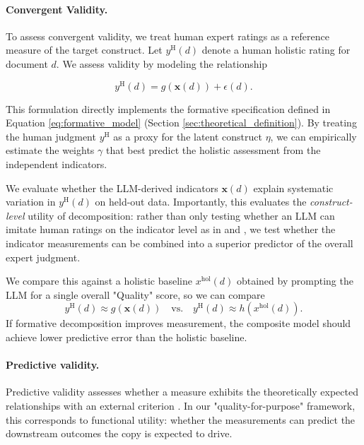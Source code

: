 \paragraph{Convergent Validity.} %
To assess convergent validity, we treat human expert ratings as a reference measure of the target construct. Let $y^{\text{H}}(d)$ denote a human holistic rating for document $d$. We assess validity by modeling the relationship

\begin{equation}\label{eq:convergent_validity_formative}
    y^{\text{H}}(d) = g(\mathbf{x}(d)) + \epsilon(d).
\end{equation}

This formulation directly implements the formative specification defined in Equation \ref{eq:formative_model} (Section \ref{sec:theoretical_definition}). By treating the human judgment $y^{\text{H}}$ as a proxy for the latent construct $\eta$, we can empirically estimate the weights $\gamma$ that best predict the holistic assessment from the independent indicators.

We evaluate whether the LLM-derived indicators $\mathbf{x}(d)$ explain systematic variation in $y^{\text{H}}(d)$ on held-out data. Importantly, this evaluates the \emph{construct-level} utility of decomposition: rather than only testing whether an LLM can imitate human ratings on the indicator level as in \citet{li-fine-grained-2026} and \citet{wang2025evaluating}, we test whether the indicator measurements can be combined into a superior predictor of the overall expert judgment.

We compare this against a holistic baseline $x^{\text{hol}}(d)$ obtained by prompting the LLM for a single overall "Quality" score, so we can compare 
\begin{equation}\label{eq:convergent_validity_holistic}
    y^{\text{H}}(d) \approx g(\mathbf{x}(d)) \quad \text{vs.} \quad y^{\text{H}}(d) \approx h(x^{\text{hol}}(d)).
\end{equation}
If formative decomposition improves measurement, the composite model should achieve lower predictive error than the holistic baseline.


\paragraph{Predictive validity.}
Predictive validity assesses whether a measure exhibits the theoretically expected relationships with an external criterion \citep{messick_validity_1994}. In our "quality-for-purpose" framework, this corresponds to functional utility: whether the measurements can predict the downstream outcomes the copy is expected to drive. %

